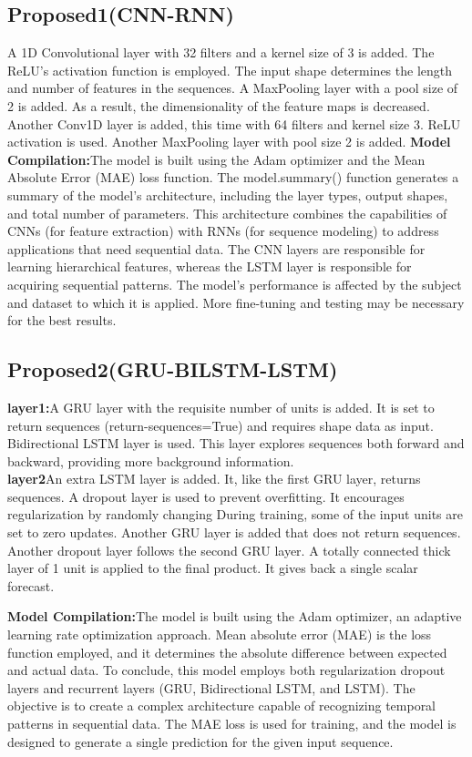 \documentclass[a4paper,fleqn]{cas-sc}
\begin{document}
\subsection{Proposed1(CNN-RNN)}A 1D Convolutional layer with 32 filters and a kernel size of 3 is added. The ReLU's activation function is employed. The input shape determines the length and number of features in the sequences. A MaxPooling layer with a pool size of 2 is added. As a result, the dimensionality of the feature maps is decreased. Another Conv1D layer is added, this time with 64 filters and kernel size 3. ReLU activation is used.
Another MaxPooling layer with pool size 2 is added.
\textbf{Model Compilation:}The model is built using the Adam optimizer and the Mean Absolute Error (MAE) loss function. The model.summary() function generates a summary of the model's architecture, including the layer types, output shapes, and total number of parameters. This architecture combines the capabilities of CNNs (for feature extraction) with RNNs (for sequence modeling) to address applications that need sequential data. The CNN layers are responsible for learning hierarchical features, whereas the LSTM layer is responsible for acquiring sequential patterns. The model's performance is affected by the subject and dataset to which it is applied. More fine-tuning and testing may be necessary for the best results.


\subsection{Proposed2(GRU-BILSTM-LSTM)}
\textbf{layer1:}A GRU layer with the requisite number of units is added. It is set to return sequences (return-sequences=True) and requires shape data as input. 
Bidirectional LSTM layer is used. This layer explores sequences both forward and backward, providing more background information.\\
\textbf{layer2}An extra LSTM layer is added. It, like the first GRU layer, returns sequences.
A dropout layer is used to prevent overfitting. It encourages regularization by randomly changing During training, some of the input units are set to zero updates.
Another GRU layer is added that does not return sequences.
Another dropout layer follows the second GRU layer.
A totally connected thick layer of 1 unit is applied to the final product. It gives back a single scalar forecast.

\textbf{Model Compilation:}The model is built using the Adam optimizer, an adaptive learning rate optimization approach. Mean absolute error (MAE) is the loss function employed, and it determines the absolute difference between expected and actual data. To conclude, this model employs both regularization dropout layers and recurrent layers (GRU, Bidirectional LSTM, and LSTM). The objective is to create a complex architecture capable of recognizing temporal patterns in sequential data. The MAE loss is used for training, and the model is designed to generate a single prediction for the given input sequence.
\end{document}
